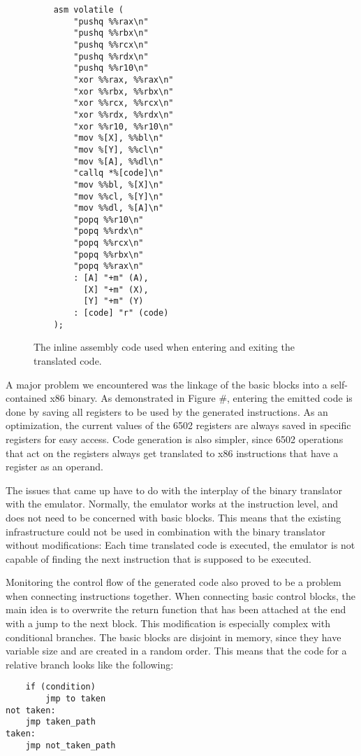 \begin{figure}[!h]
\begin{lstlisting}
    asm volatile (
        "pushq %%rax\n"
        "pushq %%rbx\n"
        "pushq %%rcx\n"
        "pushq %%rdx\n"
        "pushq %%r10\n"
        "xor %%rax, %%rax\n"
        "xor %%rbx, %%rbx\n"
        "xor %%rcx, %%rcx\n"
        "xor %%rdx, %%rdx\n"
        "xor %%r10, %%r10\n"
        "mov %[X], %%bl\n"
        "mov %[Y], %%cl\n"
        "mov %[A], %%dl\n"
        "callq *%[code]\n"
        "mov %%bl, %[X]\n"
        "mov %%cl, %[Y]\n"
        "mov %%dl, %[A]\n"
        "popq %%r10\n"
        "popq %%rdx\n"
        "popq %%rcx\n"
        "popq %%rbx\n"
        "popq %%rax\n"
        : [A] "+m" (A),
          [X] "+m" (X), 
          [Y] "+m" (Y) 
        : [code] "r" (code)
    );
\end{lstlisting}
	\caption {The inline assembly code used when entering and exiting the translated code.}
\end{figure}
 
A major problem we encountered was the linkage of the basic blocks into a self-contained x86 binary. 
As demonstrated in Figure \#, entering the emitted code is done by saving all registers to be used by the generated instructions.
As an optimization, the current values of the 6502 registers are always saved in specific registers for easy access.
Code generation is also simpler, since 6502 operations that act on the registers always get translated to x86 instructions that have a register as an operand.

The issues that came up have to do with the interplay of the binary translator with the emulator.
Normally, the emulator works at the instruction level, and does not need to be concerned with basic blocks.
This means that the existing infrastructure could not be used in combination with the binary translator without modifications:
Each time translated code is executed, the emulator is not capable of finding the next instruction that is supposed to be executed.

Monitoring the control flow of the generated code also proved to be a problem when connecting instructions together.
When connecting basic control blocks, the main idea is to overwrite the return function that has been attached at the end with a jump to the next block. 
This modification is especially complex with conditional branches. 
The basic blocks are disjoint in memory, since they have variable size and are created in a random order.
This means that the code for a relative branch looks like the following:

\begin{lstlisting}
	if (condition)
		jmp to taken
not taken:	
	jmp taken_path
taken:		
	jmp not_taken_path
\end{lstlisting}
